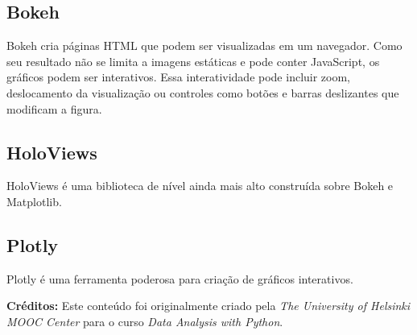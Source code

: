 \documentclass[11pt,a4paper]{article}
\begin{document}
\subsection{Bokeh}
Bokeh cria páginas HTML que podem ser visualizadas em um navegador. Como seu resultado não se limita a imagens estáticas e pode conter JavaScript, os gráficos podem ser interativos. Essa interatividade pode incluir zoom, deslocamento da visualização ou controles como botões e barras deslizantes que modificam a figura.

\subsection{HoloViews}
HoloViews é uma biblioteca de nível ainda mais alto construída sobre Bokeh e Matplotlib.

\subsection{Plotly}
Plotly é uma ferramenta poderosa para criação de gráficos interativos.

\vspace{2em}
\noindent\textbf{Créditos:} Este conteúdo foi originalmente criado pela \textit{The University of Helsinki MOOC Center} para o curso \textit{Data Analysis with Python}.
\end{document}
